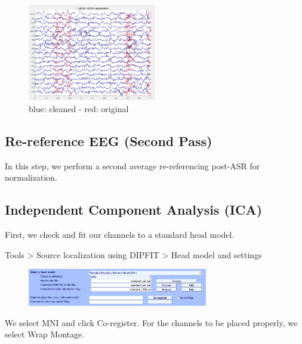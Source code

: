 \documentclass[hidelinks,12pt]{article}
\begin{document}
		\begin{figure}[h!]
			\centering
			\includegraphics[width=0.5\textwidth]{17}
			\caption{blue: cleaned - red: original}
		\end{figure}
	
	\newpage
	
	\subsection{Re-reference EEG (Second Pass)}
	
		In this step, we perform a second average re-referencing post-ASR for normalization.
		
	
	\subsection{Independent Component Analysis (ICA)}
		First, we check and fit our channels to a standard head model.
		
		Tools > Source localization using DIPFIT > Head model and settings
		
		\begin{figure}[h!]
			\centering
			\includegraphics[width=0.7\textwidth]{18}
		\end{figure}
	
		We select MNI and click Co-register. For the channels to be placed properly, we select Wrap Montage.
		
\end{document}
